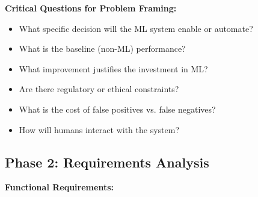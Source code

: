 \textbf{Critical Questions for Problem Framing:}

\begin{itemize}
    \item What specific decision will the ML system enable or automate?
    \item What is the baseline (non-ML) performance?
    \item What improvement justifies the investment in ML?
    \item Are there regulatory or ethical constraints?
    \item What is the cost of false positives vs. false negatives?
    \item How will humans interact with the system?
\end{itemize}

\subsection{Phase 2: Requirements Analysis}

\textbf{Functional Requirements:}

